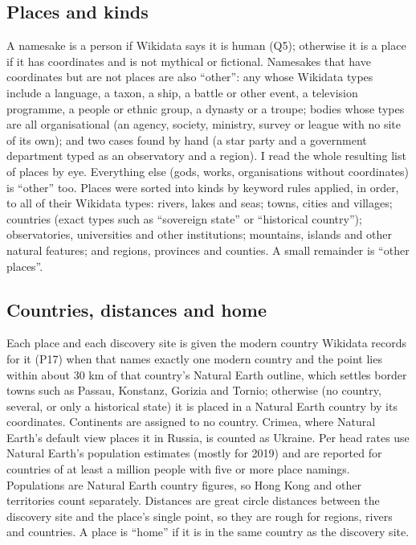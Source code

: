 \documentclass[11pt,a4paper]{article}
\begin{document}
\subsection{Places and kinds}
A namesake is a person if Wikidata says it is human (Q5); otherwise it is a place if it has coordinates and is not mythical or fictional. Namesakes that have coordinates but are not places are also ``other'': any whose Wikidata types include a language, a taxon, a ship, a battle or other event, a television programme, a people or ethnic group, a dynasty or a troupe; bodies whose types are all organisational (an agency, society, ministry, survey or league with no site of its own); and two cases found by hand (a star party and a government department typed as an observatory and a region). I read the whole resulting list of places by eye. Everything else (gods, works, organisations without coordinates) is ``other'' too. Places were sorted into kinds by keyword rules applied, in order, to all of their Wikidata types: rivers, lakes and seas; towns, cities and villages; countries (exact types such as ``sovereign state'' or ``historical country''); observatories, universities and other institutions; mountains, islands and other natural features; and regions, provinces and counties. A small remainder is ``other places''.

\subsection{Countries, distances and home}
Each place and each discovery site is given the modern country Wikidata records for it (P17) when that names exactly one modern country and the point lies within about 30 km of that country's Natural Earth outline, which settles border towns such as Passau, Konstanz, Gorizia and Tornio; otherwise (no country, several, or only a historical state) it is placed in a Natural Earth country by its coordinates. Continents are assigned to no country. Crimea, where Natural Earth's default view places it in Russia, is counted as Ukraine. Per head rates use Natural Earth's population estimates (mostly for 2019) and are reported for countries of at least a million people with five or more place namings. Populations are Natural Earth country figures, so Hong Kong and other territories count separately. Distances are great circle distances between the discovery site and the place's single point, so they are rough for regions, rivers and countries. A place is ``home'' if it is in the same country as the discovery site.
\end{document}
